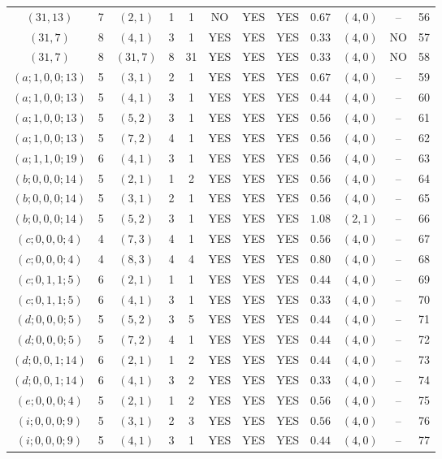 \begin{longtable}{|c|c|c|c|c|c|c|c|c|c|c|c|}
$(31,13)$ & 7 & $(2,1)$ & 1 & 1 & NO & YES & YES & $0.67$ & $(4,0)$ & -- & 56\\
$(31,7)$ & 8 & $(4,1)$ & 3 & 1 & YES & YES & YES & $0.33$ & $(4,0)$ & NO & 57\\
$(31,7)$ & 8 & $(31,7)$ & 8 & 31 & YES & YES & YES & $0.33$ & $(4,0)$ & NO & 58\\
$(a;1,0,0;13)$ & 5 & $(3,1)$ & 2 & 1 & YES & YES & YES & $0.67$ & $(4,0)$ & -- & 59\\
$(a;1,0,0;13)$ & 5 & $(4,1)$ & 3 & 1 & YES & YES & YES & $0.44$ & $(4,0)$ & -- & 60\\
$(a;1,0,0;13)$ & 5 & $(5,2)$ & 3 & 1 & YES & YES & YES & $0.56$ & $(4,0)$ & -- & 61\\
$(a;1,0,0;13)$ & 5 & $(7,2)$ & 4 & 1 & YES & YES & YES & $0.56$ & $(4,0)$ & -- & 62\\
$(a;1,1,0;19)$ & 6 & $(4,1)$ & 3 & 1 & YES & YES & YES & $0.56$ & $(4,0)$ & -- & 63\\
$(b;0,0,0;14)$ & 5 & $(2,1)$ & 1 & 2 & YES & YES & YES & $0.56$ & $(4,0)$ & -- & 64\\
$(b;0,0,0;14)$ & 5 & $(3,1)$ & 2 & 1 & YES & YES & YES & $0.56$ & $(4,0)$ & -- & 65\\
$(b;0,0,0;14)$ & 5 & $(5,2)$ & 3 & 1 & YES & YES & YES & $1.08$ & $(2,1)$ & -- & 66\\
$(c;0,0,0;4)$ & 4 & $(7,3)$ & 4 & 1 & YES & YES & YES & $0.56$ & $(4,0)$ & -- & 67\\
$(c;0,0,0;4)$ & 4 & $(8,3)$ & 4 & 4 & YES & YES & YES & $0.80$ & $(4,0)$ & -- & 68\\
$(c;0,1,1;5)$ & 6 & $(2,1)$ & 1 & 1 & YES & YES & YES & $0.44$ & $(4,0)$ & -- & 69\\
$(c;0,1,1;5)$ & 6 & $(4,1)$ & 3 & 1 & YES & YES & YES & $0.33$ & $(4,0)$ & -- & 70\\
$(d;0,0,0;5)$ & 5 & $(5,2)$ & 3 & 5 & YES & YES & YES & $0.44$ & $(4,0)$ & -- & 71\\
$(d;0,0,0;5)$ & 5 & $(7,2)$ & 4 & 1 & YES & YES & YES & $0.44$ & $(4,0)$ & -- & 72\\
$(d;0,0,1;14)$ & 6 & $(2,1)$ & 1 & 2 & YES & YES & YES & $0.44$ & $(4,0)$ & -- & 73\\
$(d;0,0,1;14)$ & 6 & $(4,1)$ & 3 & 2 & YES & YES & YES & $0.33$ & $(4,0)$ & -- & 74\\
$(e;0,0,0;4)$ & 5 & $(2,1)$ & 1 & 2 & YES & YES & YES & $0.56$ & $(4,0)$ & -- & 75\\
$(i;0,0,0;9)$ & 5 & $(3,1)$ & 2 & 3 & YES & YES & YES & $0.56$ & $(4,0)$ & -- & 76\\
$(i;0,0,0;9)$ & 5 & $(4,1)$ & 3 & 1 & YES & YES & YES & $0.44$ & $(4,0)$ & -- & 77
\end{longtable}
